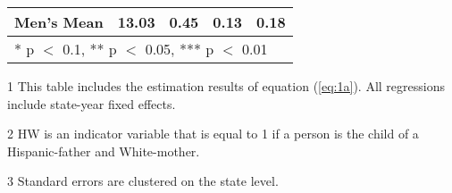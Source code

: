 \begin{table}[H]
\begin{threeparttable}
\begin{tabular}[t]{lcccc}
Men's Mean & 13.03 & 0.45 & 0.13 & 0.18\\
\bottomrule
\multicolumn{5}{l}{\rule{0pt}{1em}* p $<$ 0.1, ** p $<$ 0.05, *** p $<$ 0.01}\\
\end{tabular}
\begin{tablenotes}
\item[1] {\footnotesize{This table includes the estimation results of equation (\ref{eq:1a}). All regressions include state-year fixed effects.}}
\item[2] {\footnotesize{HW is an indicator variable that is equal to 1 if a person is the child of a Hispanic-father and White-mother.}}
\item[3] {\footnotesize{Standard errors are clustered on the state level.}}
\end{tablenotes}
\end{threeparttable}
\end{table}
